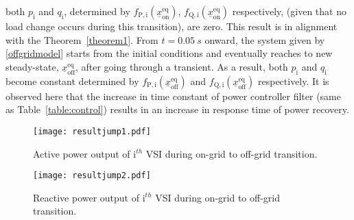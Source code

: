 \documentclass[journal]{IEEEtran}
\begin{document}
both $p_\mathrm{i}$ and $q_\mathrm{i}$, determined by $f_\mathrm{P,i}(\underline{x}_\mathrm{on}^\mathrm{eq})$, $f_\mathrm{Q,i}(\underline{x}_\mathrm{on}^\mathrm{eq})$ respectively, (given that no load change occurs during this transition), are zero. This result is in alignment with the Theorem~\ref{theorem1}. From $t=0.05~s$ onward, the system given by \eqref{offgridmodel} starts from the initial conditions and eventually reaches to new steady-state, $\underline{x}_\mathrm{off}^\mathrm{eq}$, after going through a transient. As a result, both $p_\mathrm{i}$ and $q_\mathrm{i}$ become constant determined by $f_\mathrm{P,i}(\underline{x}_\mathrm{off}^\mathrm{eq})$ and  $f_\mathrm{Q,i}(\underline{x}_\mathrm{off}^\mathrm{eq})$ respectively. It is observed here that the increase in time constant of power controller filter (same as Table~\ref{table:control}) results in an increase in response time of power recovery. 
\begin{figure}[t]
	\centering
    \texttt{[image: resultjump1.pdf]}%
	\caption{Active power output of $\mathrm{i}^{th}$ VSI during on-grid to off-grid transition.}
	\label{fig:resultjump1}
\end{figure}
\begin{figure}[t]
	\centering
    \texttt{[image: resultjump2.pdf]}%
	\caption{Reactive power output of $\mathrm{i}^{th}$ VSI during on-grid to off-grid transition.}
	\label{fig:resultjump2}
\end{figure}
\end{document}
